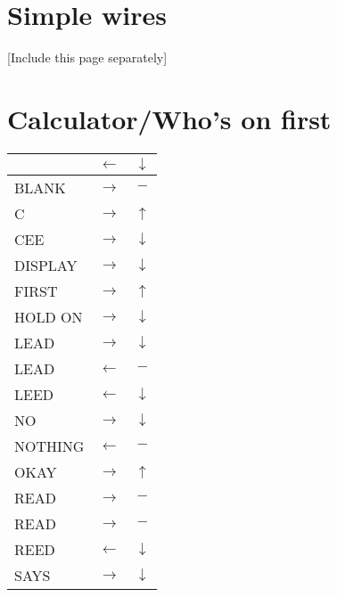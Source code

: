 \documentclass[]{article}
\title{}
\author{}
\begin{document}
\maketitle
\tableofcontents
\newpage

\section{Simple wires}
[Include this page separately]


\section{Calculator/Who's on first}
\begin{tabular}{|l|c|c|}
\hline \rule[-2ex]{0pt}{5.5ex} 				&$\leftarrow$	&$\downarrow $\\ 
\hline \rule[-2ex]{0pt}{5.5ex} BLANK		&$\rightarrow$	&$- $\\ 
\hline \rule[-2ex]{0pt}{5.5ex} C			&$\rightarrow$	&$\uparrow $\\ 
\hline \rule[-2ex]{0pt}{5.5ex} CEE			&$\rightarrow$	&$\downarrow $\\ 
\hline \rule[-2ex]{0pt}{5.5ex} DISPLAY		&$\rightarrow$	&$\downarrow $\\ 
\hline \rule[-2ex]{0pt}{5.5ex} FIRST		&$\rightarrow$	&$\uparrow $\\ 
\hline \rule[-2ex]{0pt}{5.5ex} HOLD ON		&$\rightarrow$	&$\downarrow $\\	
\hline \rule[-2ex]{0pt}{5.5ex} LEAD			&$\rightarrow$	&$\downarrow $\\	
\hline \rule[-2ex]{0pt}{5.5ex} LEAD			&$\leftarrow$	&$- $\\	
\hline \rule[-2ex]{0pt}{5.5ex} LEED			&$\leftarrow$	&$\downarrow $\\	
\hline \rule[-2ex]{0pt}{5.5ex} NO			&$\rightarrow$	&$\downarrow $\\ 
\hline \rule[-2ex]{0pt}{5.5ex} NOTHING		&$\leftarrow$	&$- $\\ 
\hline \rule[-2ex]{0pt}{5.5ex} OKAY			&$\rightarrow$	&$\uparrow $\\ 
\hline \rule[-2ex]{0pt}{5.5ex} READ			&$\rightarrow$	&$- $\\	
\hline \rule[-2ex]{0pt}{5.5ex} READ			&$\rightarrow$	&$- $\\ 
\hline \rule[-2ex]{0pt}{5.5ex} REED			&$\leftarrow$	&$\downarrow $\\	
\hline \rule[-2ex]{0pt}{5.5ex} SAYS			&$\rightarrow$	&$\downarrow $\\ 

\end{tabular}
\end{document}

